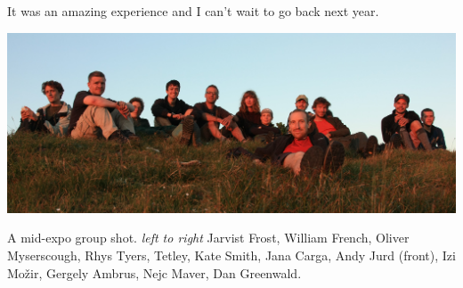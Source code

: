 It was an amazing experience and I can’t wait to go back next year.

\begin{pagefigure}
\checkoddpage \ifoddpage \forcerectofloat \else \forceversofloat \fi
   \centering
\includegraphics[width = \textwidth]{2012/alex_pitcher/rhys/2012-08-01-1123-GergelyAmbrus-IMG_2146--orig.jpg}
\caption{A mid-expo group shot. \textit{left to right} Jarvist Frost, William French, Oliver Myserscough, Rhys Tyers, Tetley, Kate Smith, Jana Carga, Andy Jurd (front), Izi Možir, Gergely Ambrus, Nejc Maver, Dan Greenwald. } \label{group sunset 2012}
\end{pagefigure}